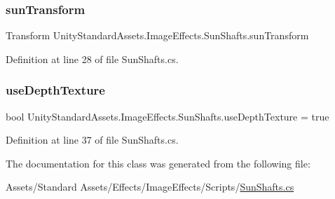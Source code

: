 \subsubsection{\texorpdfstring{sun\+Transform}{sunTransform}}
{\footnotesize\ttfamily Transform Unity\+Standard\+Assets.\+Image\+Effects.\+Sun\+Shafts.\+sun\+Transform}



Definition at line 28 of file Sun\+Shafts.\+cs.

\mbox{\label{class_unity_standard_assets_1_1_image_effects_1_1_sun_shafts_ae9f2012110c36d04ac603df5317feb17}} 
\subsubsection{\texorpdfstring{use\+Depth\+Texture}{useDepthTexture}}
{\footnotesize\ttfamily bool Unity\+Standard\+Assets.\+Image\+Effects.\+Sun\+Shafts.\+use\+Depth\+Texture = true}



Definition at line 37 of file Sun\+Shafts.\+cs.



The documentation for this class was generated from the following file\+:\begin{DoxyCompactItemize}
\item 
Assets/\+Standard Assets/\+Effects/\+Image\+Effects/\+Scripts/\mbox{\hyperlink{_sun_shafts_8cs}{Sun\+Shafts.\+cs}}\end{DoxyCompactItemize}

